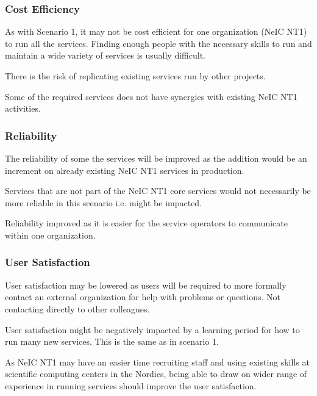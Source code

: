 \documentclass[12pt,a4paper]{article}
\newcommand{\nnt}{NeIC NT1\xspace}
\begin{document}
\subsubsection*{Cost Efficiency}
\bitm
\item As with Scenario 1, it may not be cost efficient for one organization (\nnt) to run all the services.
  Finding enough people with the necessary skills to run and maintain a wide variety of services is usually difficult.
\item There is the risk of replicating existing services run by other \einfra projects.
\item Some of the required \ED services does not have synergies with existing \nnt activities.
\eitm

\subsubsection*{Reliability}
\bitm
\item The reliability of some the services will be improved as the \ED addition would be an increment
  on already existing \nnt services in production.
\item Services that are not part of the \nnt core services would not necessarily be more reliable in this scenario i.e. might be impacted.
\item {Reliability improved as it is easier for the service operators to communicate within one organization.}
\eitm


\subsubsection*{User Satisfaction}
\bitm
\item \ED User satisfaction may be lowered as users will be required to more formally contact an external
  organization for help with problems or questions. Not contacting directly to other \EC colleagues.
\item User satisfaction might be negatively impacted by a learning period for how to run many new services.
  This is the same as in scenario 1. %
\item As \nnt may have an easier time recruiting staff and using existing skills at scientific computing centers in the Nordics,
  being able to draw on wider range of experience in running services should improve the user satisfaction.
\eitm
\end{document}

